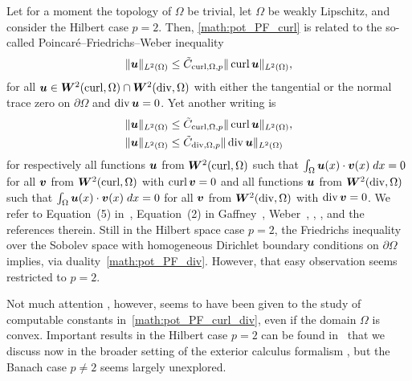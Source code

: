 \documentclass[10pt,a4paper]{article}
\newcommand\cye[1]{%
\protect\leavevmode
\begingroup
    \color{blue}%
    #1%
\endgroup
}
\begin{document}
\cye{Let for a moment the topology of $\Omega$ be trivial, let $\Omega$ be weakly Lipschitz, and consider the Hilbert case $p=2$. Then, \eqref{math:pot_PF_curl} is related to the so-called Poincar\'e--Friedrichs--Weber inequality
\begin{align}
    \label{math:Weber}
    \| \bm{u}\|_{L^{2}(\Omega)} \leq \tilde C_{\operatorname{curl},\Omega,p} \| \operatorname{curl} \bm{u} \|_{L^{2}(\Omega)},
\end{align}
for all $\bm{u} \in \bm{W}^{2}(\operatorname{curl},\Omega) \cap \bm{W}^{2}(\operatorname{div},\Omega)$ with either the tangential or the normal trace zero on $\partial \Omega$ and $\operatorname{div} \bm{u} = 0$. 
Yet another writing is 
\label{math:PF_orth} \begin{align}
    \| \bm{u}\|_{L^{2}(\Omega)} & \leq \tilde C_{\operatorname{curl},\Omega,p} \| \operatorname{curl} \bm{u} \|_{L^{2}(\Omega)}, \label{math:PF_orth_curl}\\
    \| \bm{u}\|_{L^{2}(\Omega)} & \leq \tilde C_{\operatorname{div},\Omega,p} \| \operatorname{div} \bm{u} \|_{L^{2}(\Omega)} \label{math:PF_orth_div}
\end{align}
for respectively all functions $\bm{u}$ from $\bm{W}^{2}(\operatorname{curl},\Omega)$ such that $\int_{\Omega} \bm{u}(x) \cdot \bm{v}(x) \;dx = 0$ for all $\bm{v}$ from $\bm{W}^{2}(\operatorname{curl},\Omega)$ with $\operatorname{curl} \bm{v} = 0$ and all functions $\bm{u}$ from $\bm{W}^{2}(\operatorname{div},\Omega)$ such that $\int_{\Omega} \bm{u}(x) \cdot \bm{v}(x) \;dx = 0$ for all $\bm{v}$ from $\bm{W}^{2}(\operatorname{div},\Omega)$ with $\operatorname{div} \bm{v} = 0$. We refer to Equation~(5) in~\cite{Fried_diff_forms_55}, Equation~(2) in Gaffney~\cite{Gaff_Hilbert_harm_55}, Weber~\cite{Web_compact_Maxw_80}, \cite[Lemmas~3.4 and~3.6]{Gir_Rav_NS_86}, \cite[Proposition~7.4]{Fer_Gil_Maxw_BC_97}, and the references therein. Still} in the Hilbert space case $p=2$, the Friedrichs inequality~\cite{burenkov1998sobolev} over the Sobolev space with \cye{homogeneous} Dirichlet boundary conditions \cye{on $\partial \Omega$} implies, via duality~\eqref{math:pot_PF_div}. However, that easy observation seems restricted to $p=2$. 

Not much attention\cye{, however,} seems to have been given to the study of \cye{computable} constants in~\eqref{math:pot_PF_curl_div}, even if the domain $\Omega$ is convex. \cye{Important results in the Hilbert case $p=2$ can be found in~\cite{guerini2004eigenvalue, Paul_Vald_PF_grad_curl_div_20} that we discuss now in the broader setting of} the exterior calculus formalism\cye{, but the Banach case $p \neq 2$ seems largely unexplored.}

\end{document}
